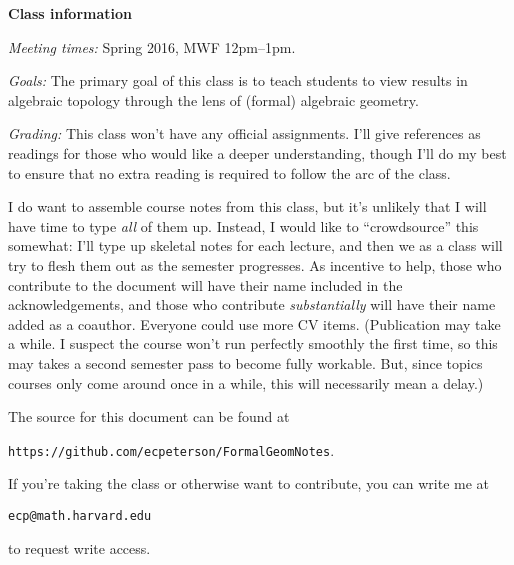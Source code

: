 
\textbf{Class information}

\vspace{2\baselineskip} \noindent \textit{Meeting times: }
Spring 2016, MWF 12pm--1pm.

\vspace{2\baselineskip} \noindent \textit{Goals: }
The primary goal of this class is to teach students to view results in algebraic topology through the lens of (formal) algebraic geometry.

\vspace{2\baselineskip} \noindent \textit{Grading: }
This class won't have any official assignments. I'll give references as readings for those who would like a deeper understanding, though I'll do my best to ensure that no extra reading is required to follow the arc of the class.

I do want to assemble course notes from this class, but it's unlikely that I will have time to type \emph{all} of them up. Instead, I would like to ``crowdsource'' this somewhat: I'll type up skeletal notes for each lecture, and then we as a class will try to flesh them out as the semester progresses. As incentive to help, those who contribute to the document will have their name included in the acknowledgements, and those who contribute \emph{substantially} will have their name added as a coauthor. Everyone could use more CV items. (Publication may take a while. I suspect the course won't run perfectly smoothly the first time, so this may takes a second semester pass to become fully workable. But, since topics courses only come around once in a while, this will necessarily mean a delay.)

The source for this document can be found at
\begin{center}
\texttt{https://github.com/ecpeterson/FormalGeomNotes}.
\end{center}
If you're taking the class or otherwise want to contribute, you can write me at
\begin{center}
\texttt{ecp@math.harvard.edu}
\end{center}
to request write access.
